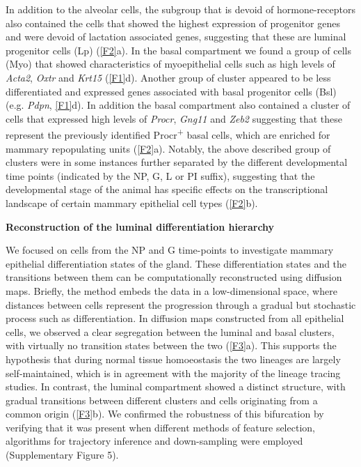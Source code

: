 \documentclass[titlepage, 12pt, oneside]{amsart}
\begin{document}
In addition to the alveolar cells, the subgroup that is devoid of hormone-receptors also contained the cells that showed the highest expression of progenitor genes and were devoid of lactation associated genes, suggesting that these are luminal progenitor cells (Lp) (\autoref{F2}a).
In the basal compartment we found a group of cells (Myo) that showed characteristics of myoepithelial cells such as high levels of \textit{Acta2}, \textit{Oxtr} and \textit{Krt15} (\autoref{F1}d).
Another group of cluster appeared to be less differentiated and expressed genes associated with basal progenitor cells (Bsl) (e.g. \textit{Pdpn}, \autoref{F1}d).
In addition the basal compartment also contained a cluster of cells that expressed high levels of \textit{Procr}, \textit{Gng11} and \textit{Zeb2} suggesting that these represent the previously identified Procr\textsuperscript{+}  basal cells, which are enriched for mammary repopulating units (\autoref{F2}a).
Notably, the above described group of clusters were in some instances further separated by the different developmental time points (indicated by the NP, G, L or PI suffix), suggesting that the developmental stage of the animal has specific effects on the transcriptional landscape of certain mammary epithelial cell types (\autoref{F2}b).

\textbf{Reconstruction of the luminal differentiation hierarchy}

We focused on cells from the NP and G time-points to investigate mammary epithelial differentiation states of the gland.
These differentiation states and the transitions between them can be computationally reconstructed using diffusion maps.
Briefly, the method embeds the data in a low-dimensional space, where distances between cells represent the progression through a gradual but stochastic process such as differentiation.
In diffusion maps constructed from all epithelial cells, we observed a clear segregation between the luminal and basal clusters, with virtually no transition states between the two (\autoref{F3}a).
This supports the hypothesis that during normal tissue homoeostasis the two lineages are largely self-maintained, which is in agreement with the majority of the lineage tracing studies\autocite{VanKeymeulen2011,VanAmerongen2012,Davis2016}.
In contrast, the luminal compartment showed a distinct structure, with gradual transitions between different clusters and cells originating from a common origin (\autoref{F3}b).
We confirmed the robustness of this bifurcation by verifying that it was present when different methods of feature selection, algorithms for trajectory inference and down-sampling were employed (Supplementary Figure 5).
\end{document}
